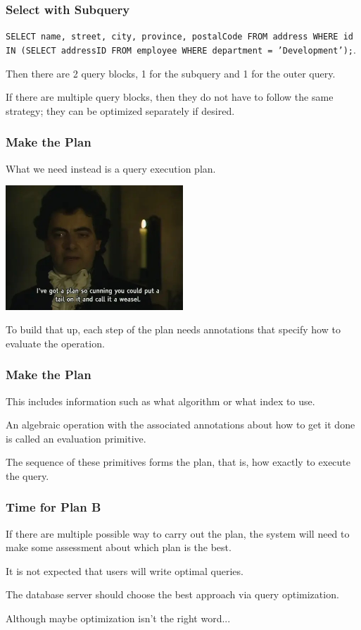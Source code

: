 \begin{frame}
\frametitle{Select with Subquery}

\texttt{SELECT name, street, city, province, postalCode FROM address WHERE id IN (SELECT addressID FROM employee WHERE department = 'Development');}. 

Then there are 2 query blocks, 1 for the subquery and 1 for the outer query. 

If there are multiple query blocks, then they do not have to follow the same strategy; they can be optimized separately if desired. 

\end{frame}


\begin{frame}
\frametitle{Make the Plan}


What we need instead is a \alert{query execution plan}.

\begin{center}
	\includegraphics[width=0.5\textwidth]{images/cunningplan.jpg}
\end{center}


To build that up, each step of the plan needs annotations that specify how to evaluate the operation. 
\end{frame}


\begin{frame}
\frametitle{Make the Plan}



This includes information such as what algorithm or what index to use. 

An algebraic operation with the associated annotations about how to get it done is called an \alert{evaluation primitive}. 

The sequence of these primitives forms the plan, that is, how exactly to execute the query.

\end{frame}

\begin{frame}
\frametitle{Time for Plan B}

If there are multiple possible way to carry out the plan, the system will need to make some assessment about which plan is the best. 

It is not expected that users will write optimal queries.

The database server should choose the best approach via \alert{query optimization}. 

Although maybe optimization isn't the right word...

\end{frame}

